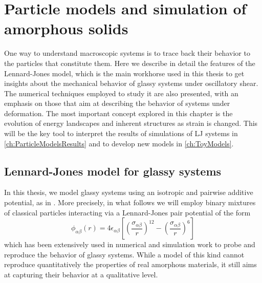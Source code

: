 \chapter{Particle models and simulation of amorphous solids \label{ch:ParticleModels}}

One way to understand macroscopic systems is to trace back their behavior to the particles that constitute them.
Here we describe in detail the features of the Lennard-Jones model, which is the main workhorse used in this thesis to get insights about the mechanical behavior of glassy systems under oscillatory shear. The numerical techniques employed to study it are also presented, with an emphasis on those that aim at describing the behavior of systems under deformation. The most important concept explored in this chapter is the evolution of energy landscapes and inherent structures as strain is changed. This will be the key tool to interpret the results of simulations of LJ systems in \autoref{ch:ParticleModelsResults} and to develop new models in \autoref{ch:ToyModels}.

\section{Lennard-Jones model for glassy systems \label{sec:LennardJonesModel}}

In this thesis, we model glassy systems using an isotropic and pairwise additive potential, as in \cite{utz2000atomistic, lacks2004energy}. More precisely, in what follows we will employ binary mixtures of classical particles interacting via a Lennard-Jones pair potential of the form 
\begin{equation}
	\phi_{\alpha \beta}(r) = 4\epsilon_{\alpha \beta} \left[ \left( \frac{\sigma_{\alpha \beta}}{r} \right)^{12} - \left( \frac{\sigma_{\alpha \beta}}{r} \right)^{6} \right]
	\label{eq:BinaryLennardJonesPotential}
\end{equation}
which has been extensively used in numerical and simulation work to probe and reproduce the behavior of glassy systems.
While a model of this kind cannot reproduce quantitatively the properties of real amorphous materials, it still aims at capturing their behavior at a qualitative level. 

